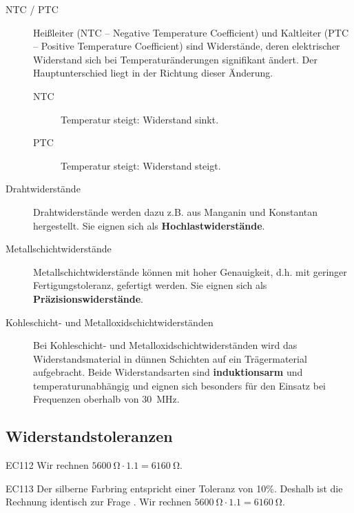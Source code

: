 \begin{ohmchapter}
\begin{description}
    \item[NTC / PTC] Heißleiter (NTC – Negative Temperature Coefficient) und Kaltleiter (PTC – Positive Temperature Coefficient) sind Widerstände, deren elektrischer Widerstand sich bei Temperaturänderungen signifikant ändert. Der Hauptunterschied liegt in der Richtung dieser Änderung.
    \begin{description}
         \item[NTC] Temperatur steigt: Widerstand sinkt.
         \item[PTC] Temperatur steigt: Widerstand steigt. 
    \end{description}  
    \item[Drahtwiderstände] Drahtwiderstände werden dazu z.B. aus Manganin und Konstantan hergestellt. Sie eignen sich als \textbf{Hochlastwiderstände}.
    \item[Metallschichtwiderstände] Metallschichtwiderstände können mit hoher Genauigkeit, d.h. mit geringer Fertigungstoleranz, gefertigt werden. Sie eignen sich als \textbf{Präzisionswiderstände}.
    \item[Kohleschicht- und Metalloxidschichtwiderständen] Bei Kohleschicht- und Metalloxidschichtwiderständen wird das Widerstandsmaterial in dünnen Schichten auf ein Trägermaterial aufgebracht. Beide Widerstandsarten sind \textbf{induktionsarm} und temperaturunabhängig und eignen sich besonders für den Einsatz bei Frequenzen oberhalb von \SI{30}{\mega\hertz}.
\end{description}   

\end{ohmchapter}  

\subsection{Widerstandstoleranzen}

  \begin{sol}{EC112}    
    Wir rechnen $\SI{5600}{\ohm} \cdot 1.1 = \SI{6160}{\ohm}$.    
  \end{sol}

  \begin{sol}{EC113}   
    Der silberne Farbring entspricht einer Toleranz von 10\%. Deshalb ist die Rechnung identisch zur Frage .
    Wir rechnen $\SI{5600}{\ohm} \cdot 1.1 = \SI{6160}{\ohm}$.    
  \end{sol}  
\begin{ohmchapter}
\end{ohmchapter}  

